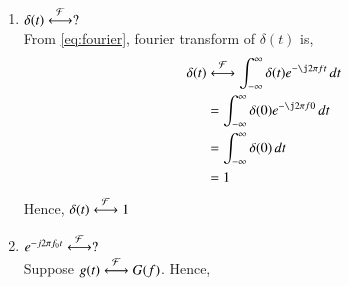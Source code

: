 \documentclass[journal,12pt,twocolumn]{IEEEtran}
\renewcommand\thesection{\arabic{section}}
\begin{document}
\begin{enumerate}[label=\thesection.\arabic*
		,ref=\thesection.\theenumi]
		Consider $g(-k)$,
		\begin{align}
			g(-k)=\int_{-\infty}^{\infty}G(f)e^{\j2\pi fk}\,df
		\end{align}
		Let $f=t$,then,
		\begin{align}
			\label{eq:3.4}
			g(-k)=\int_{-\infty}^{\infty}G(t)e^{\j2\pi tk}\,dt
		\end{align}
		Substituting $k=f$ and in the \eqref{eq:3.4}, we get, 
		\begin{align}
			\label{eq:3.4.1}
			g(-f)=\int_{-\infty}^{\infty}G(t)e^{\j2\pi ft}\,dt
		\end{align}
		Comparing \eqref{eq:3.4.1} with \eqref{eq:fourier}, we can say that,
		\begin{align}
			G(t)&\system{F}g(-f)
		\end{align}
		\item $\delta(t)\overset{\mathcal{F}}{ \longleftrightarrow}?$\\
		\solution From \eqref{eq:fourier}, fourier transform of $\delta(t)$ is,
		\begin{align}
			\delta(t)&\system{F} \int_{-\infty}^{\infty}\delta(t) e^{-\j2\pi ft} \,dt\\
			&=\int_{-\infty}^{\infty}\delta(0) e^{-\j2\pi f 0} \,dt\\
			&=\int_{-\infty}^{\infty}\delta(0) \,dt \\
			&=1
		\end{align}
		Hence,
		$\delta(t) \overset{\mathcal{F}}{ \longleftrightarrow} 1$
		\item $e^{-j2\pi f_0t}\overset{\mathcal{F}}{ \longleftrightarrow}?$\\
		\solution Suppose $g(t)\overset{\mathcal{F}}{ \longleftrightarrow}G(f)$. Hence,

\end{enumerate}
\end{document}
